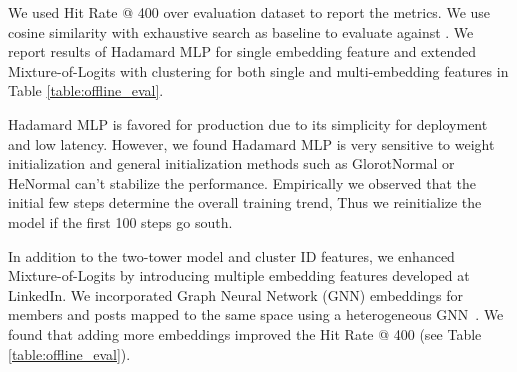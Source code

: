 
We used Hit Rate @ 400 over evaluation dataset to report the metrics. We use cosine similarity with exhaustive search as baseline to evaluate against {\systemname}. We report results of Hadamard MLP for single embedding feature and extended Mixture-of-Logits with clustering for both single and multi-embedding features in Table \ref{table:offline_eval}.

Hadamard MLP is favored for production due to its simplicity for deployment and low latency. However, we found Hadamard MLP is very sensitive to weight initialization and general initialization methods such as GlorotNormal or HeNormal can't stabilize the performance. Empirically we observed that the initial few steps determine the overall training trend, Thus we reinitialize the model if the first 100 steps go south.

In addition to the two-tower model and cluster ID features, we enhanced Mixture-of-Logits by introducing multiple embedding features developed at LinkedIn. We incorporated Graph Neural Network (GNN) embeddings for members and posts mapped to the same space using a heterogeneous GNN~\cite{borisyuk2024lignn}. We found that adding more embeddings improved the Hit Rate @ 400 (see Table \ref{table:offline_eval}).

